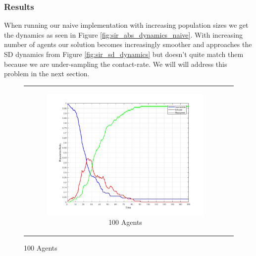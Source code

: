 \subsubsection{Results}
When running our naive implementation with increasing population sizes we get the dynamics as seen in Figure \ref{fig:sir_abs_dynamics_naive}. With increasing number of agents \cite{macal_agent-based_2010} our solution becomes increasingly smoother and approaches the SD dynamics from Figure \ref{fig:sir_sd_dynamics}  but doesn't quite match them because we are under-sampling the contact-rate. We will will address this problem in the next section.

\begin{figure}
\begin{center}
	\begin{tabular}{c c}
		\begin{subfigure}[b]{0.22\textwidth}
			\centering
			\includegraphics[width=1.0\textwidth, angle=0]{./fig/step1_randmonad/SIR_100agents_150t_1dt.png}
			\caption{100 Agents}
			\label{fig:sir_abs_approximating_1dt_100agents}
		\end{subfigure}
    	
    	&
    	

\end{tabular}
\end{center}
\end{figure}
